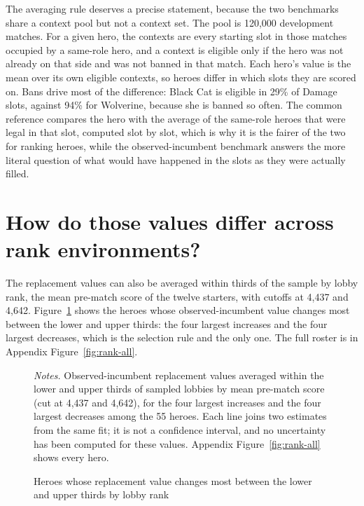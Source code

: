 \documentclass[11pt]{article}
\begin{document}
The averaging rule deserves a precise statement, because the two benchmarks share a context pool but not a
context set. The pool is 120,000 development matches. For a given hero, the contexts are every starting
slot in those matches occupied by a same-role hero, and a context is eligible only if the hero was not
already on that side and was not banned in that match. Each hero's value is the mean over its own eligible
contexts, so heroes differ in which slots they are scored on. Bans drive most of the difference: Black Cat
is eligible in 29\% of Damage slots, against 94\% for Wolverine, because she is banned
so often. The common reference compares the hero with the average of the same-role heroes that were legal
in that slot, computed slot by slot, which is why it is the fairer of the two for ranking heroes, while the
observed-incumbent benchmark answers the more literal question of what would have happened in the slots as
they were actually filled.

\section*{How do those values differ across rank environments?}

The replacement values can also be averaged within thirds of the sample by lobby rank, the mean pre-match
score of the twelve starters, with cutoffs at 4,437 and 4,642. Figure~\ref{fig:rank} shows
the heroes whose observed-incumbent value changes most between the lower and upper thirds: the four
largest increases and the four largest decreases, which is the selection rule and the only one. The
full roster is in Appendix Figure~\ref{fig:rank-all}.

\begin{figure}[H]\centering
\caption{Heroes whose replacement value changes most between the lower and upper thirds by lobby rank}
\label{fig:rank}
\vspace{2pt}


\begin{minipage}{0.95\linewidth}\footnotesize\vspace{2pt}
\emph{Notes.} Observed-incumbent replacement values averaged within the lower and upper thirds of sampled
lobbies by mean pre-match score (cut at 4,437 and 4,642), for the four largest increases and
the four largest decreases among the 55 heroes. Each line joins two estimates from the same fit; it is not
a confidence interval, and no uncertainty has been computed for these values. Appendix
Figure~\ref{fig:rank-all} shows every hero.
\end{minipage}
\end{figure}
\end{document}
